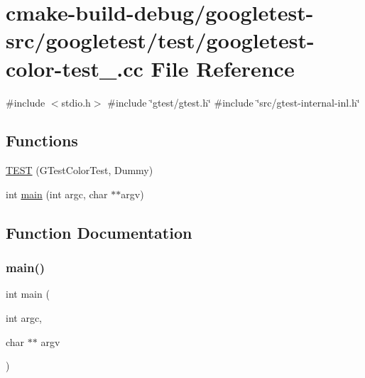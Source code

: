 \hypertarget{googletest-color-test___8cc}{}\section{cmake-\/build-\/debug/googletest-\/src/googletest/test/googletest-\/color-\/test\+\_\+.cc File Reference}
\label{googletest-color-test___8cc}
{\ttfamily \#include $<$stdio.\+h$>$}\newline
{\ttfamily \#include \char`\"{}gtest/gtest.\+h\char`\"{}}\newline
{\ttfamily \#include \char`\"{}src/gtest-\/internal-\/inl.\+h\char`\"{}}\newline
\subsection*{Functions}
\begin{DoxyCompactItemize}
\item 
\mbox{\hyperlink{googletest-color-test___8cc_a78903f80b07f944e7aa466ebdff1d644}{T\+E\+ST}} (G\+Test\+Color\+Test, Dummy)
\item 
int \mbox{\hyperlink{googletest-color-test___8cc_a3c04138a5bfe5d72780bb7e82a18e627}{main}} (int argc, char $\ast$$\ast$argv)
\end{DoxyCompactItemize}


\subsection{Function Documentation}
\mbox{\label{googletest-color-test___8cc_a3c04138a5bfe5d72780bb7e82a18e627}} 
\subsubsection{\texorpdfstring{main()}{main()}}
{\footnotesize\ttfamily int main (\begin{DoxyParamCaption}\item[{int}]{argc,  }\item[{char $\ast$$\ast$}]{argv }\end{DoxyParamCaption})}

